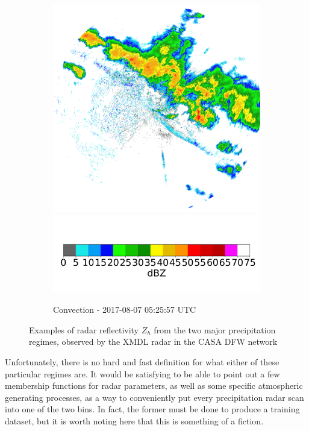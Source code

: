 \begin{figure}[h]
\begin{subfigure}[b]{0.45\textwidth}
		\includegraphics[width=\textwidth]{./thesis_code/plots/midlothian-tx-20170624-063034-ref-CONVECTION.png}
		\includegraphics[width=\textwidth]{./thesis_code/plots/dfw_colormap.png}
		\caption{Convection - 2017-08-07 05:25:57 UTC}
		\label{fig:meteorology_convectionexample}
	\end{subfigure}
	\caption{Examples of radar reflectivity $Z_h$ from the two major precipitation regimes, observed by the XMDL radar in the CASA DFW network}
	\label{fig:meteorology_examples}
\end{figure}

Unfortunately, there is no hard and fast definition for what either of these particular regimes are.
It would be satisfying to be able to point out a few membership functions for radar parameters, as well as some specific atmospheric generating processes, as a way to conveniently put every precipitation radar scan into one of the two bins.
In fact, the former must be done to produce a training dataset, but it is worth noting here that this is something of a fiction.

